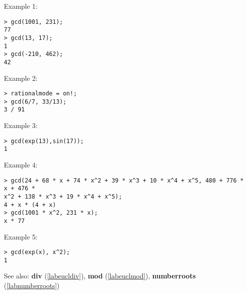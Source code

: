 \noindent Example 1: 
\begin{center}\begin{minipage}{15cm}\begin{Verbatim}[frame=single]
> gcd(1001, 231);
77
> gcd(13, 17);
1
> gcd(-210, 462);
42
\end{Verbatim}
\end{minipage}\end{center}
\noindent Example 2: 
\begin{center}\begin{minipage}{15cm}\begin{Verbatim}[frame=single]
> rationalmode = on!;
> gcd(6/7, 33/13);
3 / 91
\end{Verbatim}
\end{minipage}\end{center}
\noindent Example 3: 
\begin{center}\begin{minipage}{15cm}\begin{Verbatim}[frame=single]
> gcd(exp(13),sin(17));
1
\end{Verbatim}
\end{minipage}\end{center}
\noindent Example 4: 
\begin{center}\begin{minipage}{15cm}\begin{Verbatim}[frame=single]
> gcd(24 + 68 * x + 74 * x^2 + 39 * x^3 + 10 * x^4 + x^5, 480 + 776 * x + 476 * 
x^2 + 138 * x^3 + 19 * x^4 + x^5);
4 + x * (4 + x)
> gcd(1001 * x^2, 231 * x);
x * 77
\end{Verbatim}
\end{minipage}\end{center}
\noindent Example 5: 
\begin{center}\begin{minipage}{15cm}\begin{Verbatim}[frame=single]
> gcd(exp(x), x^2);
1
\end{Verbatim}
\end{minipage}\end{center}
See also: \textbf{div} (\ref{labeucldiv}), \textbf{mod} (\ref{labeuclmod}), \textbf{numberroots} (\ref{labnumberroots})

